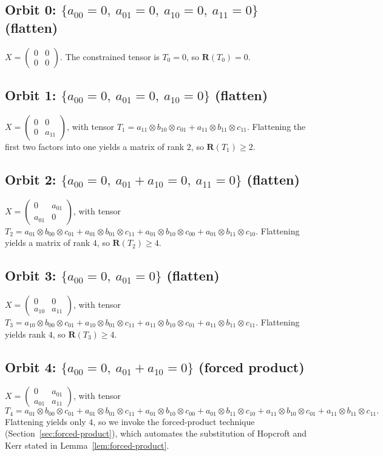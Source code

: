 \documentclass[11pt]{article}
\theoremstyle{definition}
\newcommand{\R}{\mathbf{R}}
\begin{document}
\subsection*{Orbit 0: $\{a_{00}=0,\ a_{01}=0,\ a_{10}=0,\ a_{11}=0\}$ (flatten)}
$X=
\begin{pmatrix}0 & 0 \\0&0
\end{pmatrix}$. The constrained tensor is $T_0=0$, so
$\R(T_0)=0$.

\subsection*{Orbit 1: $\{a_{00}=0,\ a_{01}=0,\ a_{10}=0\}$ (flatten)}
$X=
\begin{pmatrix}0 & 0 \\0&a_{11}
\end{pmatrix}$, with tensor
$T_1=a_{11}\otimes b_{10}\otimes c_{01}+a_{11}\otimes b_{11}\otimes c_{11}$.
Flattening the first two factors into one yields a matrix of rank $2$, so
$\R(T_1)\ge 2$.

\subsection*{Orbit 2: $\{a_{00}=0,\ a_{01}+a_{10}=0,\ a_{11}=0\}$ (flatten)}
$X=
\begin{pmatrix}0 & a_{01} \\a_{01}&0
\end{pmatrix}$, with tensor
$T_2=a_{01}\otimes b_{00}\otimes c_{01}+a_{01}\otimes b_{01}\otimes c_{11}
+a_{01}\otimes b_{10}\otimes c_{00}+a_{01}\otimes b_{11}\otimes c_{10}$.
Flattening yields a matrix of rank $4$, so $\R(T_2)\ge 4$.

\subsection*{Orbit 3: $\{a_{00}=0,\ a_{01}=0\}$ (flatten)}
$X=
\begin{pmatrix}0 & 0 \\a_{10}&a_{11}
\end{pmatrix}$, with tensor
$T_3=a_{10}\otimes b_{00}\otimes c_{01}+a_{10}\otimes b_{01}\otimes c_{11}
+a_{11}\otimes b_{10}\otimes c_{01}+a_{11}\otimes b_{11}\otimes c_{11}$.
Flattening yields rank $4$, so $\R(T_3)\ge 4$.

\subsection*{Orbit 4: $\{a_{00}=0,\ a_{01}+a_{10}=0\}$ (forced product)}
$X=
\begin{pmatrix}0 & a_{01} \\a_{01}&a_{11}
\end{pmatrix}$, with tensor
\[
  T_4=a_{01}\otimes b_{00}\otimes c_{01}+a_{01}\otimes b_{01}\otimes c_{11}
  +a_{01}\otimes b_{10}\otimes c_{00}+a_{01}\otimes b_{11}\otimes c_{10}
  +a_{11}\otimes b_{10}\otimes c_{01}+a_{11}\otimes b_{11}\otimes c_{11}.
\]
Flattening yields only $4$, so we invoke the forced-product technique
(Section~\ref{sec:forced-product}), which automates the substitution of Hopcroft and
Kerr stated in Lemma~\ref{lem:forced-product}.
\end{document}
